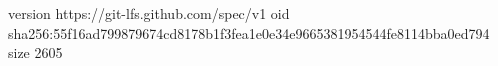 version https://git-lfs.github.com/spec/v1
oid sha256:55f16ad799879674cd8178b1f3fea1e0e34e9665381954544fe8114bba0ed794
size 2605
